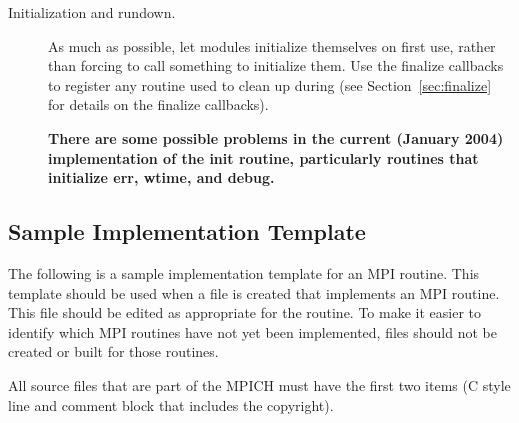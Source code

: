 \documentclass{article}
\begin{document}
\begin{description}
\item[Initialization and rundown.] As much as possible, let modules initialize 
themselves on first use, rather than forcing  to call
something 
to initialize them.  Use the finalize callbacks to register any routine used
to clean up during  (see Section~\ref{sec:finalize}
for details on the finalize callbacks).

\textbf{There are some possible problems in the current (January 2004)
  implementation of the init routine, particularly routines that
  initialize err, wtime, and debug.}

\end{description}

\subsection{Sample Implementation Template}
\label{sec:template}

The following is a sample implementation template for an MPI routine.
This template should be used when a file is created that implements an
MPI routine.  This file should be edited as appropriate for the
routine.  To make it easier to identify which MPI routines have not
yet been implemented, files should not be created or built for those routines.

All source files that are part of the MPICH must have the first two
items (C style line and comment block that includes the copyright).
\end{document}
